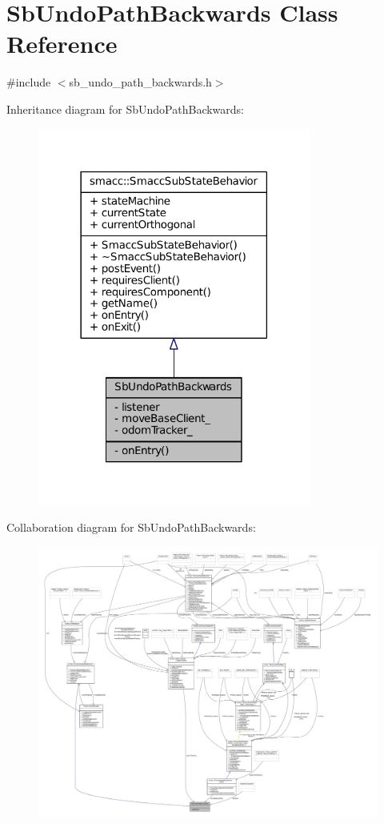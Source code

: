 \hypertarget{classSbUndoPathBackwards}{}\section{Sb\+Undo\+Path\+Backwards Class Reference}
\label{classSbUndoPathBackwards}


{\ttfamily \#include $<$sb\+\_\+undo\+\_\+path\+\_\+backwards.\+h$>$}



Inheritance diagram for Sb\+Undo\+Path\+Backwards\+:
\nopagebreak
\begin{figure}[H]
\begin{center}
\leavevmode
\includegraphics[width=254pt]{classSbUndoPathBackwards__inherit__graph}
\end{center}
\end{figure}


Collaboration diagram for Sb\+Undo\+Path\+Backwards\+:
\nopagebreak
\begin{figure}[H]
\begin{center}
\leavevmode
\includegraphics[width=350pt]{classSbUndoPathBackwards__coll__graph}
\end{center}
\end{figure}
